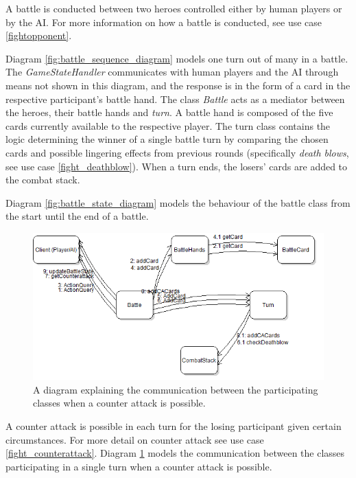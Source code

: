 A battle is conducted between two heroes controlled either by human players or by the AI. For more information on how a battle is conducted, see use case \ref{fightopponent}.

Diagram \ref{fig:battle_sequence_diagram} models one turn out of many in a battle. The \emph{GameStateHandler} communicates with human players and the AI through means not shown in this diagram, and the response is in the form of a card in the respective participant's battle hand. The class \emph{Battle} acts as a mediator between the heroes, their battle hands and \emph{turn}. A battle hand is composed of the five cards currently available to the respective player. The turn class contains the logic determining the winner of a single battle turn by comparing the chosen cards and possible lingering effects from previous rounds (specifically \emph{death blows}, see use case \ref{fight_deathblow}). When a turn ends, the losers' cards are added to the combat stack.

Diagram \ref{fig:battle_state_diagram} models the behaviour of the battle class from the start until the end of a battle.

\begin{figure}[h]
\center
\includegraphics{diagrams/CounterAttackCommDiagram.png}
\caption{A diagram explaining the communication between the participating classes when a counter attack is possible.}
\label{fig:counter_attack_comm_diagram}
\end{figure}

A counter attack is possible in each turn for the losing participant given certain circumstances. For more detail on counter attack see use case \ref{fight_counterattack}. Diagram \ref{fig:counter_attack_comm_diagram} models the communication between the classes participating in a single turn when a counter attack is possible.


